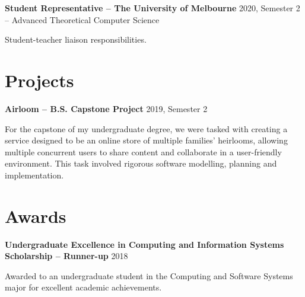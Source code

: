 \documentclass[10pt]{article}
\newcommand{\entry}[3]{
    \textbf{#1} \newline
    {\footnotesize #2}
    \begin{flushleft}
        #3
    \end{flushleft}
}
\begin{document}
\begin{minipage}[t]{.60\textwidth}
\entry{Student Representative -- The University of Melbourne}
{2020, Semester 2 -- Advanced Theoretical Computer Science}
{
    Student-teacher liaison responsibilities.
}

\medskip

\section{Projects}

\entry{Airloom -- B.S. Capstone Project}
{2019, Semester 2}
{
    For the capstone of my undergraduate degree, we were tasked with creating a service designed to be an online 
    store of multiple families' heirlooms, allowing multiple concurrent users to share content and collaborate in a 
    user-friendly environment. This task involved rigorous software modelling, planning and implementation. 
}

\medskip

\section{Awards}

\entry{Undergraduate Excellence in Computing and Information Systems Scholarship -- Runner-up}
{2018} 
{
    Awarded to an undergraduate student in the Computing and Software Systems major for excellent academic achievements.
}

\end{minipage}
\end{document}
